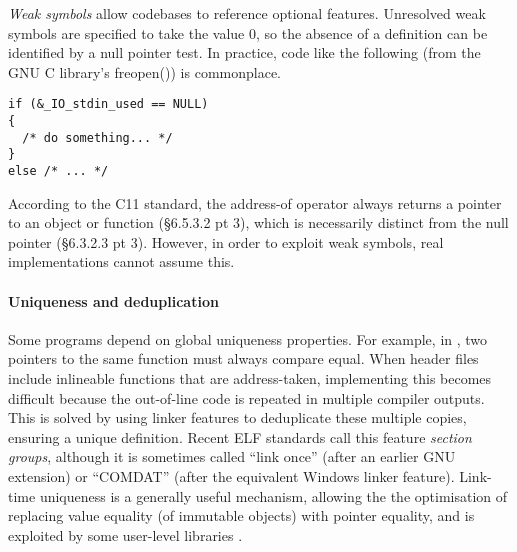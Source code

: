\emph{Weak symbols} allow codebases to reference optional features. 
Unresolved weak symbols are specified to take the value 0, so 
the absence of a definition can be identified by a null pointer test.
In practice, code like the following (from the GNU C library's 
\textsf{freopen()}) is commonplace.

{\scriptsize\begin{lstlisting}
if (&_IO_stdin_used == NULL)
{
  /* do something... */
}
else /* ... */
\end{lstlisting}}

According to the C11 standard, the address-of operator 
always returns a pointer to an object or function
(\S 6.5.3.2 pt 3), which is necessarily distinct from the null pointer
(\S6.3.2.3 pt 3).
However, in order to exploit weak symbols, real implementations
cannot assume this.

% 

\paragraph{Uniqueness and deduplication}
Some programs depend on global uniqueness properties. 
For example, in \Cplusplus{}, two pointers to the same function
must always compare equal.
When header files include inlineable functions that are address-taken, 
implementing this becomes difficult because the
out-of-line code is repeated in multiple compiler outputs.
This is solved by using linker features 
to deduplicate these multiple copies, ensuring a unique definition.
Recent ELF standards call this feature \emph{section groups},
although it is sometimes called ``link once'' (after an earlier GNU extension) or
``COMDAT'' (after the equivalent Windows linker feature).
Link-time uniqueness is a generally useful mechanism, allowing the 
the optimisation of replacing value equality (of immutable objects) with pointer equality,
and is exploited by some user-level libraries \citep{kell_towards_2015}.

